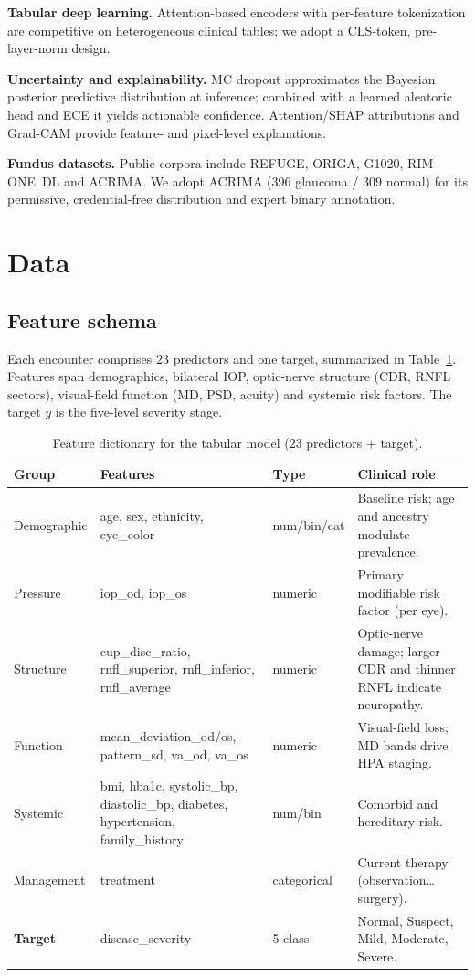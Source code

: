 \documentclass[10pt,twocolumn]{article}
\begin{document}
\textbf{Tabular deep learning.} Attention-based encoders with per-feature
tokenization are competitive on heterogeneous clinical tables; we adopt a CLS-token,
pre-layer-norm design.

\textbf{Uncertainty and explainability.} MC dropout approximates the Bayesian
posterior predictive distribution at inference; combined with a learned aleatoric
head and ECE it yields actionable confidence. Attention/SHAP attributions and
Grad-CAM provide feature- and pixel-level explanations.

\textbf{Fundus datasets.} Public corpora include REFUGE, ORIGA, G1020, RIM-ONE~DL and
ACRIMA. We adopt ACRIMA ($396$ glaucoma / $309$ normal) for its permissive,
credential-free distribution and expert binary annotation.

\section{Data}
\label{sec:data}

\subsection{Feature schema}
Each encounter comprises $23$ predictors and one target, summarized in
Table~\ref{tab:features}. Features span demographics, bilateral IOP, optic-nerve
structure (CDR, RNFL sectors), visual-field function (MD, PSD, acuity) and systemic
risk factors. The target $y$ is the five-level severity stage.

\begin{table}[t]
\centering
\caption{Feature dictionary for the tabular model ($23$ predictors $+$ target).}
\label{tab:features}
\small
\begin{tabular}{lllp{}}
\toprule
Group & Features & Type & Clinical role \\
\midrule
Demographic & age, sex, ethnicity, eye\_color & num/bin/cat & Baseline risk; age and ancestry modulate prevalence. \\
Pressure & iop\_od, iop\_os & numeric & Primary modifiable risk factor (per eye). \\
Structure & cup\_disc\_ratio, rnfl\_superior, rnfl\_inferior, rnfl\_average & numeric & Optic-nerve damage; larger CDR and thinner RNFL indicate neuropathy. \\
Function & mean\_deviation\_od/os, pattern\_sd, va\_od, va\_os & numeric & Visual-field loss; MD bands drive HPA staging. \\
Systemic & bmi, hba1c, systolic\_bp, diastolic\_bp, diabetes, hypertension, family\_history & num/bin & Comorbid and hereditary risk. \\
Management & treatment & categorical & Current therapy (observation\dots surgery). \\
\midrule
\textbf{Target} & disease\_severity & 5-class & Normal, Suspect, Mild, Moderate, Severe. \\
\bottomrule
\end{tabular}
\end{table}
\end{document}
